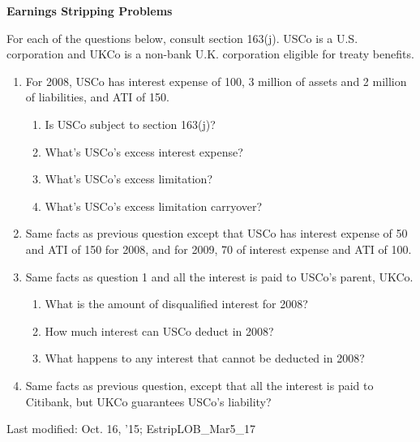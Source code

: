 	\begin{center}
		\textbf{Earnings Stripping Problems}
	\end{center}
	\begin{select}
	
For each of the questions below, consult section 163(j).  USCo is a U.S. corporation and UKCo is a non-bank U.K. corporation eligible for treaty benefits.   

	\begin{enumerate}
		\item For 2008, USCo has interest expense of 100, 3 million of assets and 2 million of liabilities, and ATI of 150.
				\begin{enumerate}
					\item Is USCo subject to section 163(j)?
					\item What's USCo's excess interest expense?
					\item What's USCo's excess limitation?
					\item What's USCo's excess limitation carryover?
				\end{enumerate}  
			\item Same facts as previous question except that USCo has interest expense of 50 and ATI of 150 for 2008, and for 2009, 70 of interest expense and ATI of 100. 			
			\item Same facts as question 1 and all the interest is paid to USCo's parent, UKCo.  
				\begin{enumerate}
					\item What is the amount of disqualified interest for 2008?
					\item How much interest can USCo deduct in 2008?
					\item What happens to any interest that cannot be deducted in 2008?
				\end{enumerate}
			\item Same facts as previous question, except that all the interest is paid to Citibank, but UKCo guarantees USCo's liability?
		
		\end{enumerate}
	\end{select}	


     
     
     \begin{framed}
     Last modified: Oct. 16, '15; EstripLOB\_Mar5\_17
     \end{framed}
